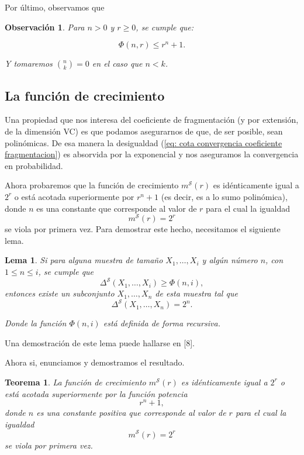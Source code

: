 \documentclass{report}
\newtheorem{thm}{Teorema}[subsection]
\newtheorem{lem}{Lema}[subsection]
\newtheorem{obs}{Observación}[subsection]
\begin{document}
Por último, observamos que

\begin{obs}   
Para \( n > 0 \) y \( r \geq 0 \), se cumple que:

\[
\Phi(n, r) \leq r^n + 1.
\]

Y tomaremos \( \binom{n}{k} = 0 \) en el caso que \( n < k \).\newline
\end{obs}

\subsection{La función de crecimiento}

Una propiedad que nos interesa del coeficiente de fragmentación (y por extensión, de la dimensión VC) es que podamos asegurarnos
de que, de ser posible, sean polinómicas. De esa manera la desigualdad (\ref{eq: cota convergencia coeficiente fragmentacion})
es absorvida por la exponencial y nos aseguramos la convergencia en probabilidad. \newline

Ahora probaremos que la función de crecimiento $m^{\mathcal{S}}(r)$ 
es idénticamente igual a \( 2^r \) o está acotada superiormente por \( r^n + 1 \) (es decir, es a lo sumo polinómica),  
donde \( n \) es una constante que corresponde al valor de \( r \) para el cual la igualdad  
\[
m^{\mathcal{S}}(r) = 2^r
\]
se viola por primera vez. Para demostrar este hecho, necesitamos el siguiente lema.\newline

\begin{lem}\label{Lema 1}
Si para alguna muestra de tamaño \( X_1, \dots, X_i \) y algún número \( n \), con \( 1 \leq n \leq i \),  
se cumple que  
\[
\Delta^{\mathcal{S}}(X_1, \dots, X_i) \geq \Phi(n, i),
\]  
entonces existe un subconjunto \( X_1, \dots, X_n \) de esta muestra tal que  
\[
\Delta^{\mathcal{S}}(X_1, \dots, X_n) = 2^n.
\]  

Donde la función \( \Phi(n, i) \) está definida de forma recursiva.  
\end{lem}

Una demostración de este lema puede hallarse en [8].\newline

Ahora si, enunciamos y demostramos el resultado.\newline

\begin{thm} \label{teo: cota polinomica de la función de crecimiento}
    La función de crecimiento \( m^{\mathcal{S}}(r) \) es idénticamente igual a \( 2^r \) o está acotada superiormente por la función potencia  
    \[
    r^n + 1,
    \]
    donde \( n \) es una constante positiva que corresponde al valor de \( r \) para el cual la igualdad  
    \[
    m^{\mathcal{S}}(r) = 2^r
    \]
    se viola por primera vez.    
\end{thm}
\end{document}
